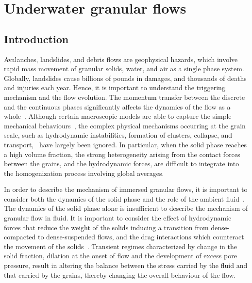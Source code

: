 \chapter{Underwater granular flows}

\ifpdf
    \graphicspath{{Chapter6/figs/raster/}{Chapter6/figs/pdf/}{Chapter6/figs/}}
\else
    \graphicspath{{Chapter6/figs/vector/}{Chapter6/figs/}}
\fi

\section{Introduction}
Avalanches, landslides, and debris flows are geophysical hazards, which involve 
rapid mass movement of granular solids, water, and air as a single phase 
system. Globally, landslides cause billions of pounds in damages, and thousands 
of deaths and injuries each year. Hence, it is important to understand the 
triggering mechanism and the flow evolution. The momentum transfer between the 
discrete and the continuous phases significantly affects the dynamics of the 
flow 
as a whole~\citep{Topin2012}. Although certain macroscopic models are able to 
capture the simple mechanical behaviours~\citep{Peker2007}, the complex 
physical mechanisms occurring at the grain scale, such as hydrodynamic 
instabilities, 
formation of clusters, collapse, and transport,~\citep{Topin2011} have largely 
been ignored. In particular, when the solid phase reaches a high volume 
fraction, the strong heterogeneity arising from the contact forces between the 
grains, and the hydrodynamic forces, are difficult to integrate into the 
homogenization process involving global averages. 

In order to describe the mechanism of immersed 
granular flows, it is important to consider both the dynamics of the solid 
phase and the role of the ambient fluid~\citep{Denlinger2001}. The dynamics of 
the solid phase alone is insufficient to describe the mechanism of granular 
flow in fluid. It is important to consider the effect of hydrodynamic forces 
that reduce the weight of the solids inducing a transition from dense-compacted 
to dense-suspended flows, and the drag interactions which counteract the 
movement of the solids~\citep{Meruane2010}. Transient regimes characterized by 
change in the solid fraction, dilation at the onset of flow and the development 
of excess pore pressure, result in altering the balance between the stress 
carried by the fluid and that carried by the grains, thereby changing the 
overall behaviour of the flow. 


